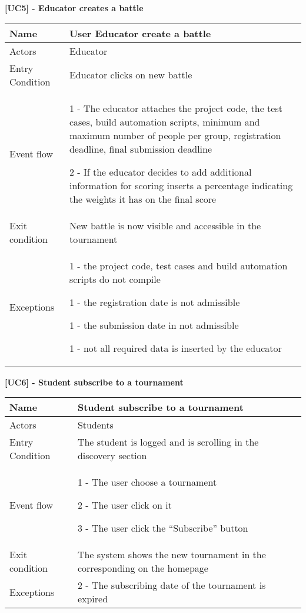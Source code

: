     \begin{table}[]
    \textbf{[UC5] - Educator creates a battle}
    
      \centering
      \begin{tabular}{|p{3cm}|p{14cm}|}
        \hline
         Name & User Educator create a battle \\
        \hline
        Actors & Educator \\
        \hline
        Entry Condition & Educator clicks on new battle \\
        \hline
        Event flow &  1 - The educator attaches the project code, the test cases, build automation scripts, minimum and maximum number of people per group, registration deadline, final submission deadline  
        
        2 - If the educator decides to add additional information for scoring inserts a percentage indicating the weights it has on the final score
        \\
        \hline
        Exit condition & New battle is now visible and accessible in the tournament \\
        \hline
        Exceptions & 1 - the project code, test cases and build automation scripts do not compile
        
        1 - the registration date is not admissible
        
        1 - the submission date in not admissible
        
        1 - not all required data is inserted by the educator
        \\
        \hline
      \end{tabular}
      
    \end{table}

    \begin{table}[h]
      \textbf{[UC6] - Student subscribe to a tournament}
      
      \centering
      \begin{tabular}{|p{3cm}|p{14cm}|}
        \hline
        Name & Student subscribe to a tournament \\
        \hline
        Actors & Students \\
        \hline
        Entry Condition & The student is logged and is scrolling in the discovery section \\
        \hline
        Event flow &  1 - The user choose a tournament
        
        2 - The user click on it

        3 - The user click the ``Subscribe'' button
        \\
        \hline
        Exit condition & The system shows the new tournament in the corresponding on the homepage \\
        \hline
        Exceptions & 2 - The subscribing date of the tournament is expired  
        \\
        \hline
      \end{tabular}
    \end{table}

